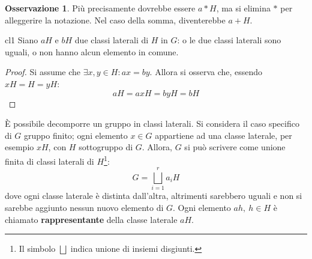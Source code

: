 \documentclass[11pt, a4paper]{scrartcl}
\theoremstyle{definition}
\numberwithin{esempio}{section}
\theoremstyle{definition}
\newtheorem{obs}{Osservazione}
\numberwithin{obs}{section}
\numberwithin{nota}{section}
\numberwithin{equation}{subsection}
\begin{document}
\begin{obs}
	Pi\`u precisamente dovrebbe essere $a * H$, ma si elimina $*$ per alleggerire la notazione. Nel caso della somma, diventerebbe $a+ H$.
\end{obs}
\begin{teorema}
	{}{cl1}
	Siano $aH$ e $bH$ due classi laterali di $H$ in $G$: o le due classi laterali sono uguali, o non hanno alcun elemento in comune.
	\begin{proof}
		Si assume che $\exists x,y \in H: ax= by$. Allora si osserva che, essendo $xH = H = yH$:
		\[
		aH = axH = byH = bH
		\] 
	\end{proof}
\end{teorema}
\`E possibile decomporre un gruppo in classi laterali. 
Si considera il caso specifico di $G$ gruppo finito; ogni elemento $x \in G$ appartiene ad una classe laterale, per esempio $xH$, con $H$ sottogruppo di $G$.
Allora, $G$ si pu\`o scrivere come unione finita di classi laterali di $H$\footnote{Il simbolo $\bigsqcup$ indica unione di insiemi disgiunti.}:
\begin{equation}
	G = \bigsqcup_{i=1} ^r a _i H
\end{equation}
dove ogni classe laterale \`e distinta dall'altra, altrimenti sarebbero uguali e non si sarebbe aggiunto nessun nuovo elemento di $G$.
Ogni elemento $ah, \ h \in H$ \`e chiamato \textbf{rappresentante} della classe laterale $aH$.
\end{document}
